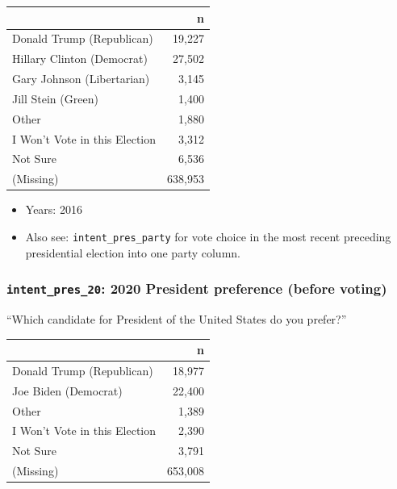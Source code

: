 \documentclass[10pt,article,oneside]{memoir}
\begin{document}
\begin{table}[H]
\centering
\begin{tabular}[t]{lr}
\toprule
 & n\\
\midrule
Donald Trump (Republican) & 19,227\\
Hillary Clinton (Democrat) & 27,502\\
Gary Johnson (Libertarian) & 3,145\\
Jill Stein (Green) & 1,400\\
Other & 1,880\\
I Won't Vote in this Election & 3,312\\
Not Sure & 6,536\\
(Missing) & 638,953\\
\bottomrule
\end{tabular}
\end{table}

\begin{itemize}
\tightlist
\item
  Years: 2016
\item
  Also see: \texttt{intent\_pres\_party} for vote choice in the most
  recent preceding presidential election into one party column.
\end{itemize}

\subsubsection{\texorpdfstring{\texttt{intent\_pres\_20}: 2020 President
preference (before
voting)}{intent\_pres\_20: 2020 President preference (before voting)}}\label{intent_pres_20-2020-president-preference-before-voting}

``Which candidate for President of the United States do you prefer?''

\begin{table}[H]
\centering
\begin{tabular}[t]{lr}
\toprule
 & n\\
\midrule
Donald Trump (Republican) & 18,977\\
Joe Biden (Democrat) & 22,400\\
Other & 1,389\\
I Won't Vote in this Election & 2,390\\
Not Sure & 3,791\\
(Missing) & 653,008\\
\bottomrule
\end{tabular}
\end{table}
\end{document}
